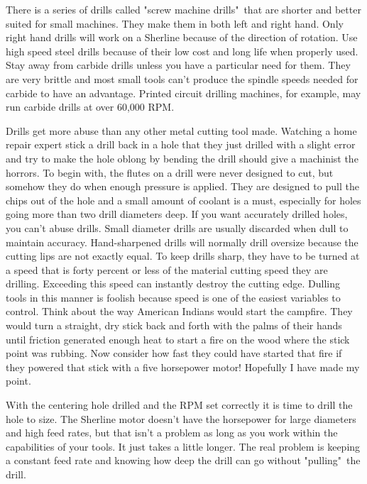 There is a series of drills called "screw machine drills"\ that are shorter and
better suited for small machines. They make them in both left and right hand.
Only right hand drills will work on a Sherline because of the direction of
rotation. Use high speed steel drills because of their low cost and long life
when properly used. Stay away from carbide drills unless you have a particular
need for them. They are very brittle and most small tools can't produce the
spindle speeds needed for carbide to have an advantage. Printed circuit drilling
machines, for example, may run carbide drills at over 60,000 RPM.


Drills get more abuse than any other metal cutting tool made. Watching a home
repair expert stick a drill back in a hole that they just drilled with a slight
error and try to make the hole oblong by bending the drill should give a
machinist the horrors. To begin with, the flutes on a drill were never designed
to cut, but somehow they do when enough pressure is applied. They are designed
to pull the chips out of the hole and a small amount of coolant is a must,
especially for holes going more than two drill diameters deep. If you want
accurately drilled holes, you can't abuse drills. Small diameter drills are
usually discarded when dull to maintain accuracy. Hand-sharpened drills will
normally drill oversize because the cutting lips are not exactly equal. To keep
drills sharp, they have to be turned at a speed that is forty percent or less of
the material cutting speed they are drilling. Exceeding this speed can instantly
destroy the cutting edge. Dulling tools in this manner is foolish because speed
is one of the easiest variables to control. Think about the way American Indians
would start the campfire. They would turn a straight, dry stick back and forth
with the palms of their hands until friction generated enough heat to start a
fire on the wood where the stick point was rubbing. Now consider how fast they
could have started that fire if they powered that stick with a five horsepower
motor! Hopefully I have made my point.

With the centering hole drilled and the RPM set correctly it is time to drill
the hole to size. The Sherline motor doesn't have the horsepower for large
diameters and high feed rates, but that isn't a problem as long as you work
within the capabilities of your tools. It just takes a little longer. The real
problem is keeping a constant feed rate and knowing how deep the drill can go
without "pulling"\ the drill.

